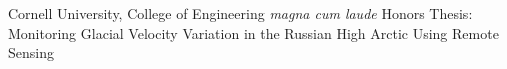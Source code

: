 
        {Cornell University, College of Engineering}{}
        {\textit{magna cum laude}}
        {Honors Thesis: Monitoring Glacial Velocity Variation in the Russian High Arctic Using Remote Sensing}
